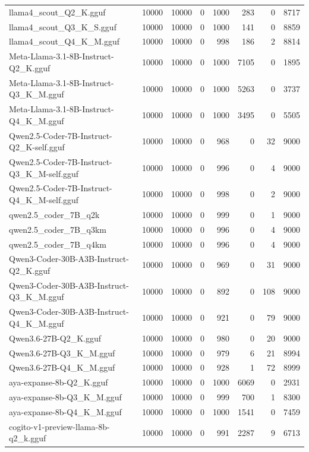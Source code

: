 \begin{table}[htbp]
{\begin{tabular}{lrrrrrrr}
    llama4\_scout\_Q2\_K.gguf & 10000 & 10000 & 0 & 1000 & 283 & 0 & 8717 \\
    llama4\_scout\_Q3\_K\_S.gguf & 10000 & 10000 & 0 & 1000 & 141 & 0 & 8859 \\
    llama4\_scout\_Q4\_K\_M.gguf & 10000 & 10000 & 0 & 998 & 186 & 2 & 8814 \\
    Meta-Llama-3.1-8B-Instruct-Q2\_K.gguf & 10000 & 10000 & 0 & 1000 & 7105 & 0 & 1895 \\
    Meta-Llama-3.1-8B-Instruct-Q3\_K\_M.gguf & 10000 & 10000 & 0 & 1000 & 5263 & 0 & 3737 \\
    Meta-Llama-3.1-8B-Instruct-Q4\_K\_M.gguf & 10000 & 10000 & 0 & 1000 & 3495 & 0 & 5505 \\
    Qwen2.5-Coder-7B-Instruct-Q2\_K-self.gguf & 10000 & 10000 & 0 & 968 & 0 & 32 & 9000 \\
    Qwen2.5-Coder-7B-Instruct-Q3\_K\_M-self.gguf & 10000 & 10000 & 0 & 996 & 0 & 4 & 9000 \\
    Qwen2.5-Coder-7B-Instruct-Q4\_K\_M-self.gguf & 10000 & 10000 & 0 & 998 & 0 & 2 & 9000 \\
    qwen2.5\_coder\_7B\_q2k & 10000 & 10000 & 0 & 999 & 0 & 1 & 9000 \\
    qwen2.5\_coder\_7B\_q3km & 10000 & 10000 & 0 & 996 & 0 & 4 & 9000 \\
    qwen2.5\_coder\_7B\_q4km & 10000 & 10000 & 0 & 996 & 0 & 4 & 9000 \\
    Qwen3-Coder-30B-A3B-Instruct-Q2\_K.gguf & 10000 & 10000 & 0 & 969 & 0 & 31 & 9000 \\
    Qwen3-Coder-30B-A3B-Instruct-Q3\_K\_M.gguf & 10000 & 10000 & 0 & 892 & 0 & 108 & 9000 \\
    Qwen3-Coder-30B-A3B-Instruct-Q4\_K\_M.gguf & 10000 & 10000 & 0 & 921 & 0 & 79 & 9000 \\
    Qwen3.6-27B-Q2\_K.gguf & 10000 & 10000 & 0 & 980 & 0 & 20 & 9000 \\
    Qwen3.6-27B-Q3\_K\_M.gguf & 10000 & 10000 & 0 & 979 & 6 & 21 & 8994 \\
    Qwen3.6-27B-Q4\_K\_M.gguf & 10000 & 10000 & 0 & 928 & 1 & 72 & 8999 \\
    aya-expanse-8b-Q2\_K.gguf & 10000 & 10000 & 0 & 1000 & 6069 & 0 & 2931 \\
    aya-expanse-8b-Q3\_K\_M.gguf & 10000 & 10000 & 0 & 999 & 700 & 1 & 8300 \\
    aya-expanse-8b-Q4\_K\_M.gguf & 10000 & 10000 & 0 & 1000 & 1541 & 0 & 7459 \\
    cogito-v1-preview-llama-8b-q2\_k.gguf & 10000 & 10000 & 0 & 991 & 2287 & 9 & 6713 \\

\end{tabular}}
\end{table}
